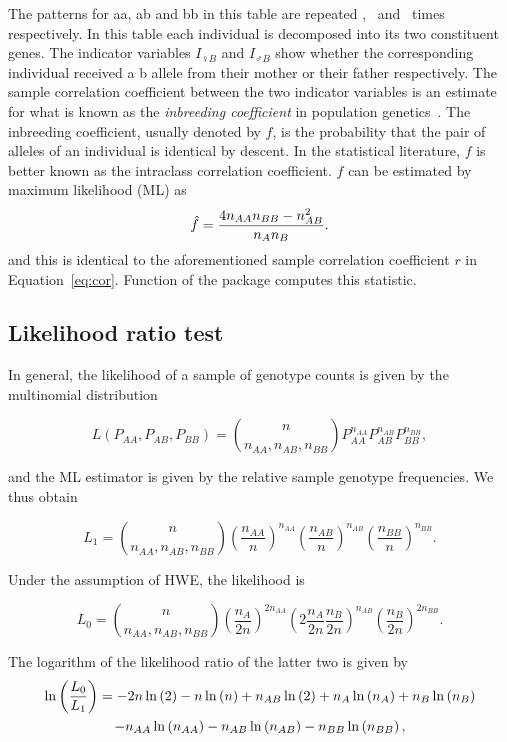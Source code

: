 \documentclass[nojss]{jss}
\begin{document}
The patterns for {\sc aa, ab} and {\sc bb} in this table are repeated
\naa, \nab\ and \nbb\ times respectively.  In this table each
individual is decomposed into its two constituent genes.  The
indicator variables $I_{\female B}$ and $I_{\male B}$ show whether the
corresponding individual received a {\sc b} allele from their mother
or their father respectively. The sample correlation coefficient
between the two indicator variables is an estimate for what is known
as the {\it inbreeding coefficient} in population
genetics~\citep[Chapter 3]{crow2}. The inbreeding coefficient, usually
denoted by $f$, is the probability that the pair of alleles of an
individual is identical by descent. In the statistical literature, $f$
is better known as the intraclass correlation coefficient. $f$ can be
estimated by maximum likelihood (ML) as
\begin{equation}
\hat{f} = \frac{4 n_{AA} n_{BB} - n_{AB}^2}{n_{A} n_{B}}.
\label{eq:f}
\end{equation} 
and this is identical to the aforementioned sample correlation
coefficient $r$ in Equation~\ref{eq:cor}. Function  of the
package computes this statistic.

\subsection{Likelihood ratio test}
\label{subsec:likelihood}

In general, the likelihood of a sample of genotype counts is given by
the multinomial distribution

\[
L(P_{AA},P_{AB},P_{BB}) = \binom{n}{n_{AA},n_{AB},n_{BB}} P_{AA}^{n_{AA}}  P_{AB}^{n_{AB}} P_{BB}^{n_{BB}},
\]

and the ML estimator is given by the relative sample genotype frequencies. We thus obtain

\[
L_1 = \binom{n}{n_{AA},n_{AB},n_{BB}} {\left( \frac{n_{AA}}{n} \right) }^{n_{AA}}  
      {\left(\frac{n_{AB}}{n} \right)}^{n_{AB}} {\left( \frac{n_{BB}}{n} \right)}^{n_{BB}}.
\]

Under the assumption of HWE, the likelihood is

\[
L_0 = \binom{n}{n_{AA},n_{AB},n_{BB}} {\left( \frac{n_A}{2n} \right) }^{2 n_{AA}}  
      {\left( 2 \frac{n_A}{2n} \frac{n_B}{2n} \right)}^{n_{AB}} {\left( \frac{n_B}{2n} \right)}^{2n_{BB}}.
\]

The logarithm of the likelihood ratio of the latter two is given by
\begin{multline}
\ln \left( \frac{L_0}{L_1} \right) = -2n \ln \left( 2 \right) - n \ln \left( n \right) + n_{AB} \ln \left( 2 \right) + n_A \ln \left( n_A \right) + n_B \ln \left( n_B \right) \\
      - n_{AA} \ln \left( n_{AA} \right) - n_{AB} \ln \left( n_{AB} \right) - n_{BB} \ln \left( n_{BB} \right),
\end{multline}
\end{document}
